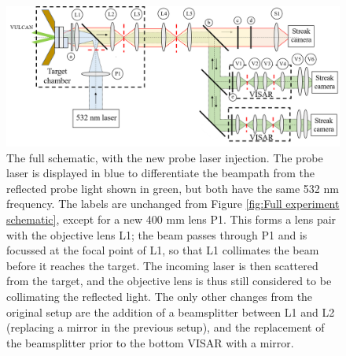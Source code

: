 \begin{figure}
\begin{centering}
\includegraphics[width=1.0\textwidth]{figures/Experiment/Full experiment schematic new laser injection.png}%
\caption{\label{fig:Full experiment schematic with new laser setup} The full schematic, with the new probe laser injection. The probe laser is displayed in blue to differentiate the beampath from the reflected probe light shown in green, but both have the same 532 nm frequency. The labels are unchanged from Figure \ref{fig:Full experiment schematic}, except for a new 400 mm lens P1. This forms a lens pair with the objective lens L1; the beam passes through P1 and is focussed at the focal point of L1, so that L1 collimates the beam before it reaches the target. The incoming laser is then scattered from the target, and the objective lens is thus still considered to be collimating the reflected light. The only other changes from the original setup are the addition of a beamsplitter between L1 and L2 (replacing a mirror in the previous setup), and the replacement of the beamsplitter prior to the bottom VISAR with a mirror.}
\end{centering}
\end{figure}

